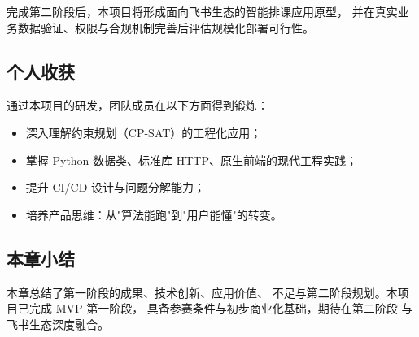 完成第二阶段后，本项目将形成面向飞书生态的智能排课应用原型，
并在真实业务数据验证、权限与合规机制完善后评估规模化部署可行性。

\subsection{个人收获}

通过本项目的研发，团队成员在以下方面得到锻炼：
\begin{itemize}[leftmargin=2em,itemsep=0.1em]
\item 深入理解约束规划（CP-SAT）的工程化应用；
\item 掌握 Python 数据类、标准库 HTTP、原生前端的现代工程实践；
\item 提升 CI/CD 设计与问题分解能力；
\item 培养产品思维：从"算法能跑"到"用户能懂"的转变。
\end{itemize}

\subsection{本章小结}

本章总结了第一阶段的成果、技术创新、应用价值、
不足与第二阶段规划。本项目已完成 MVP 第一阶段，
具备参赛条件与初步商业化基础，期待在第二阶段
与飞书生态深度融合。
